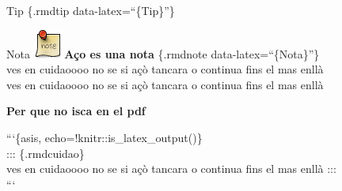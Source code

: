 \documentclass[
  10pt,
]{krantz}
\begin{document}
\begin{rmdtip}{Tip}
\{.rmdtip data-latex=``\{Tip\}''\}

\end{rmdtip}

\begin{rmdnote}{Nota}
\includegraphics{imatges/note.png} \textbf{Aço es una nota} \{.rmdnote data-latex=``\{Nota\}''\}\\
ves en cuidaoooo no se si açò tancara o continua fins el mas enllà\\
ves en cuidaoooo no se si açò tancara o continua fins el mas enllà

\end{rmdnote}

\begin{rmdinfo}{}
\textbf{Per que no isca en el pdf}

```\{asis, echo=!knitr::is\_latex\_output()\}\\
::: \{.rmdcuidao\}\\
ves en cuidaoooo no se si açò tancara o continua fins el mas enllà :::\\
```

\end{rmdinfo}

  
\end{document}
